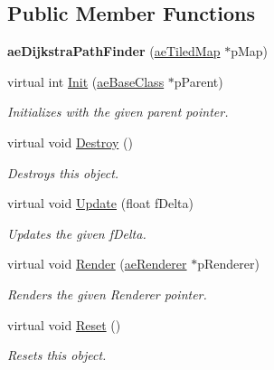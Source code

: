 \subsection*{Public Member Functions}
\begin{DoxyCompactItemize}
\item 
{\bfseries ae\+Dijkstra\+Path\+Finder} (\hyperlink{classae_tiled_map}{ae\+Tiled\+Map} $\ast$p\+Map)\hypertarget{classae_dijkstra_path_finder_acc5e17fae2b26a51e2b5017cc79ee776}{}\label{classae_dijkstra_path_finder_acc5e17fae2b26a51e2b5017cc79ee776}

\item 
virtual int \hyperlink{classae_dijkstra_path_finder_a0cc9454fad1387bba68f879afb1f2526}{Init} (\hyperlink{classae_base_class}{ae\+Base\+Class} $\ast$p\+Parent)
\begin{DoxyCompactList}\small\item\em Initializes with the given parent pointer. \end{DoxyCompactList}\item 
virtual void \hyperlink{classae_dijkstra_path_finder_ad9639e3ff07de514f28124f7318ebe33}{Destroy} ()\hypertarget{classae_dijkstra_path_finder_ad9639e3ff07de514f28124f7318ebe33}{}\label{classae_dijkstra_path_finder_ad9639e3ff07de514f28124f7318ebe33}

\begin{DoxyCompactList}\small\item\em Destroys this object. \end{DoxyCompactList}\item 
virtual void \hyperlink{classae_dijkstra_path_finder_a400f2f0645f9939bc11c140b3e6cf3d8}{Update} (float f\+Delta)
\begin{DoxyCompactList}\small\item\em Updates the given f\+Delta. \end{DoxyCompactList}\item 
virtual void \hyperlink{classae_dijkstra_path_finder_a75779c09b89c1262cc216f081763927d}{Render} (\hyperlink{classae_core_1_1ae_renderer}{ae\+Renderer} $\ast$p\+Renderer)
\begin{DoxyCompactList}\small\item\em Renders the given Renderer pointer. \end{DoxyCompactList}\item 
virtual void \hyperlink{classae_dijkstra_path_finder_a19def2693faf239d6c8cf36a573d3ab9}{Reset} ()\hypertarget{classae_dijkstra_path_finder_a19def2693faf239d6c8cf36a573d3ab9}{}\label{classae_dijkstra_path_finder_a19def2693faf239d6c8cf36a573d3ab9}

\begin{DoxyCompactList}\small\item\em Resets this object. \end{DoxyCompactList}\end{DoxyCompactItemize}

